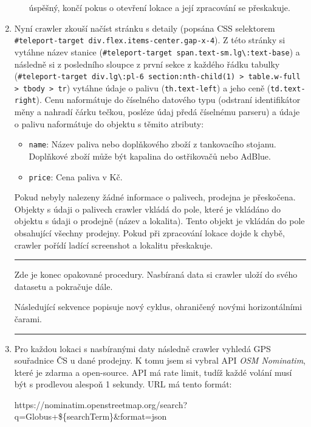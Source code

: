 \begin{enumerate}
\begin{enumerate}
                úspěšný, končí pokus o otevření lokace a její zpracování se přeskakuje.
        \end{enumerate}
    \item Nyní crawler zkouší načíst stránku s detaily (popsána CSS selektorem
        \texttt{\#teleport-target div.flex.items-center.gap-x-4}). Z této stránky
        si vytáhne název stanice
        (\texttt{\#teleport-target span.text-sm.lg\textbackslash:text-base})
        a následně si z posledního sloupce z první sekce z každého řádku tabulky
        (\texttt{\#teleport-target div.lg\textbackslash:pl-6 section:nth-child(1)
        > table.w-full > tbody > tr}) vytáhne údaje o palivu (\texttt{th.text-left})
        a jeho ceně (\texttt{td.text-right}). Cenu naformátuje do číselného datového
        typu (odstraní identifikátor měny a nahradí čárku tečkou, posléze údaj
        předá číselnému parseru) a údaje o palivu naformátuje do objektu s těmito
        atributy:
        \begin{itemize}
            \item \texttt{name}: Název paliva nebo doplňkového zboží z tankovacího
                stojanu. Doplňkové zboží může být kapalina do ostřikovačů nebo AdBlue.
            \item \texttt{price}: Cena paliva v Kč.
        \end{itemize}
        Pokud nebyly nalezeny žádné informace o palivech, prodejna je přeskočena.
        Objekty s údaji o palivech crawler vkládá do pole, které je vkládáno do objektu
        s údaji o prodejně (název a lokalita). Tento objekt je vkládán do pole obsahující
        všechny prodejny. Pokud při zpracování lokace dojde k chybě, crawler pořídí
        ladící screenshot a lokalitu přeskakuje.
        \hrule
        Zde je konec opakované procedury. Nasbíraná data si crawler uloží do svého
        datasetu a pokračuje dále.
        
        Následující sekvence popisuje nový cyklus, ohraničený novými horizontálními
        čarami.
        \hrule
    \item Pro každou lokaci s nasbíranými daty následně crawler vyhledá GPS souřadnice
        ČS u dané prodejny. K tomu jsem si vybral API \emph{OSM Nominatim}, které
        je zdarma a open-source. API má rate limit, tudíž každé volání musí být
        s prodlevou alespoň 1 sekundy. URL má tento formát:
        
        \begin{tt}
            \centering
            https://nominatim.openstreetmap.org/search?q=Globus+\$\{searchTerm\}\&format=json
        \end{tt}
        

\end{enumerate}
